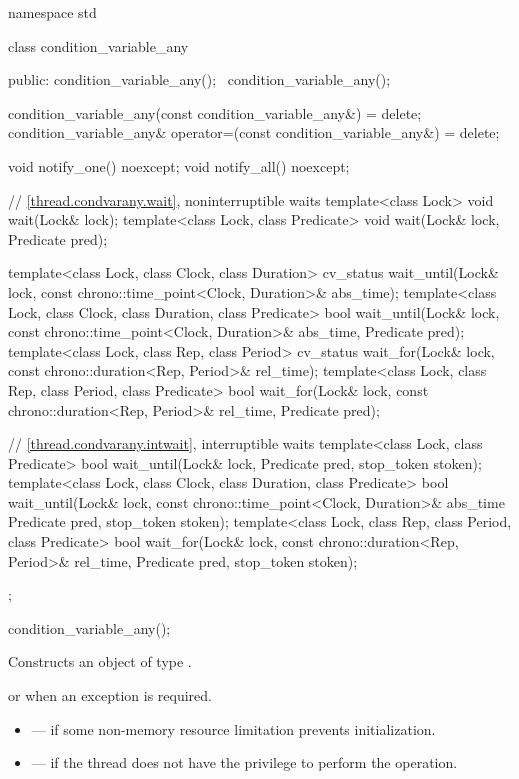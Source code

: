 %
\begin{codeblock}
namespace std {
  class condition_variable_any {
  public:
    condition_variable_any();
    ~condition_variable_any();

    condition_variable_any(const condition_variable_any&) = delete;
    condition_variable_any& operator=(const condition_variable_any&) = delete;

    void notify_one() noexcept;
    void notify_all() noexcept;

    // \ref{thread.condvarany.wait}, noninterruptible waits
    template<class Lock>
      void wait(Lock& lock);
    template<class Lock, class Predicate>
      void wait(Lock& lock, Predicate pred);

    template<class Lock, class Clock, class Duration>
      cv_status wait_until(Lock& lock, const chrono::time_point<Clock, Duration>& abs_time);
    template<class Lock, class Clock, class Duration, class Predicate>
      bool wait_until(Lock& lock, const chrono::time_point<Clock, Duration>& abs_time,
                      Predicate pred);
    template<class Lock, class Rep, class Period>
      cv_status wait_for(Lock& lock, const chrono::duration<Rep, Period>& rel_time);
    template<class Lock, class Rep, class Period, class Predicate>
      bool wait_for(Lock& lock, const chrono::duration<Rep, Period>& rel_time, Predicate pred);

    // \ref{thread.condvarany.intwait}, interruptible waits
    template<class Lock, class Predicate>
      bool wait_until(Lock& lock, Predicate pred, stop_token stoken);
    template<class Lock, class Clock, class Duration, class Predicate>
      bool wait_until(Lock& lock, const chrono::time_point<Clock, Duration>& abs_time
                      Predicate pred, stop_token stoken);
    template<class Lock, class Rep, class Period, class Predicate>
      bool wait_for(Lock& lock, const chrono::duration<Rep, Period>& rel_time,
                    Predicate pred, stop_token stoken);
  };
}
\end{codeblock}

%
\begin{itemdecl}
condition_variable_any();
\end{itemdecl}

\begin{itemdescr}
\pnum
\effects
Constructs an object of type .

\pnum
\throws
{} or  when an exception is
required.

\pnum
\errors
\begin{itemize}
\item {} --- if some non-memory resource
limitation prevents initialization.

\item {} --- if the thread does not have the
privilege to perform the operation.
\end{itemize}
\end{itemdescr}

